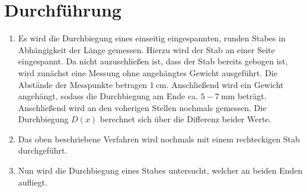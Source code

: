 
\section{Durchführung}
\label{sec:Durchführung}

\renewcommand{\labelenumi}{\alph{enumi})}
\begin{enumerate}
  \item Es wird die Durchbiegung eines einseitig eingespannten, runden Stabes in
   Abhängigkeit der Länge gemessen. Hierzu wird der Stab an einer Seite eingespannt.
   Da nicht auzuschließen ist, dass der Stab bereits gebogen ist, wird zunächst
    eine Messung ohne angehängtes Gewicht ausgeführt. Die Abstände der Messpunkte betragen
     $\SI{1}{\centi\meter}$. Anschließend wird ein Gewicht angehängt, sodass
      die Durchbiegung am Ende ca. $5-\SI{7}{\milli\meter}$ beträgt. Anschließend
       wird an den voherigen Stellen nochmals gemessen. Die Durchbiegung $D(x)$
       berechnet sich über die Differenz beider Werte.

       \item Das oben beschriebene Verfahren wird nochmals mit einem
        rechteckigen Stab durchgeführt.

        \item Nun wird die Durchbiegung eines Stabes untersucht, welcher an beiden Enden aufliegt.

\end{enumerate}
